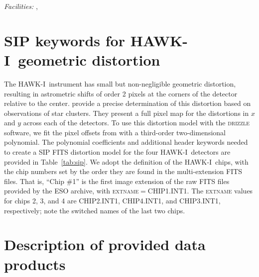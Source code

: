 \documentclass[preprint2]{aastex6}
\gdef\HAWKI{\mbox{HAWK-I}}
\begin{document}

{\it Facilities:} ,  %


%


\appendix

\section{SIP keywords for \HAWKI\ geometric distortion}

The \HAWKI\ instrument has small but non-negligible geometric distortion, resulting in astrometric shifts of order 2 pixels at the corners of the detector relative to the center.  \cite{libralato:14} provide a precise determination of this distortion based on observations of star clusters.  They present a full pixel map for the distortions in $x$ and $y$ across each of the detectors.  To use this distortion model with the \textsc{drizzle} software, we fit the pixel offsets from \cite{libralato:14} with a third-order two-dimensional polynomial.  The polynomial coefficients and additional header keywords needed to create a SIP FITS distortion model \citep{fits:sip} for the four \HAWKI\ detectors are provided in Table~\ref{tab:sip}.  We adopt the \cite{libralato:14} definition of the \HAWKI\ chips, with the chip numbers set by the order they are found in the multi-extension FITS files.  That is, ``Chip \#1'' is the first image extension of the raw FITS files provided by the ESO archive, with \textsc{extname}$=$CHIP1.INT1.  The \textsc{extname} values for chips 2, 3, and 4 are CHIP2.INT1, CHIP4.INT1, and CHIP3.INT1, respectively; note the switched names of the last two chips.

\section{Description of provided data products}

\clearpage
\end{document}
